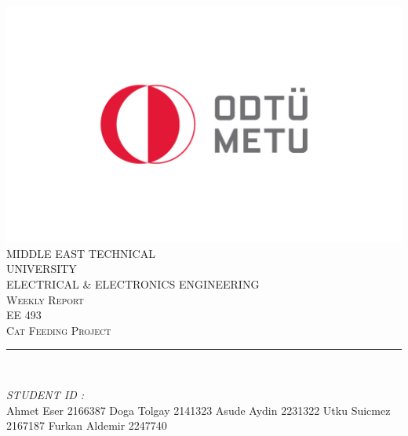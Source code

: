 \begin{titlepage}
	\centering
    \vspace*{0.5 cm}
    \includegraphics[scale = 1.5]{METU_Logo.jpg}\\[0.5 cm]	%
    \textsc{\Large MIDDLE EAST TECHNICAL} \\[0.2 cm]
    \textsc{\Large UNIVERSITY} \\ [1.0 cm]
    \textsc{\large ELECTRICAL \& ELECTRONICS ENGINEERING} \\[0.2 cm]
    \textsc{\large Weekly Report \weekNum}\\[0.2 cm]
	\textsc{\large EE 493}\\[0.5 cm]				%
	\textsc{\large Cat Feeding Project}\\[0.2 cm]
	\rule{\linewidth}{0.2 mm} \\[0.2 cm]
	
	\begin{minipage}{0.4\textwidth}
		
			\begin{flushright} 
			\emph{STUDENT ID :} \\
		
		Ahmet Eser  	2166387\linebreak
		Doga Tolgay   	2141323\linebreak
		Asude Aydin	    2231322\linebreak
		Utku Suicmez 	2167187\linebreak
		Furkan Aldemir 	2247740\linebreak
		\end{flushright}
	\end{minipage}\\[2 cm]
	
	\vfill
	
\end{titlepage}
